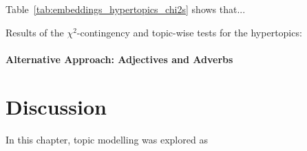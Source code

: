 Table~\ref{tab:embeddings_hypertopics_chi2s} shows that...

\begin{table}
    \centering
    
    \caption{Results of the $\chi^2$-contingency and topic-wise tests for the hypertopics: }\label{tab:embeddings_hypertopics_chi2s}
\end{table}

\paragraph{Alternative Approach: Adjectives and Adverbs}


\section{Discussion}
In this chapter, topic modelling was explored as 
